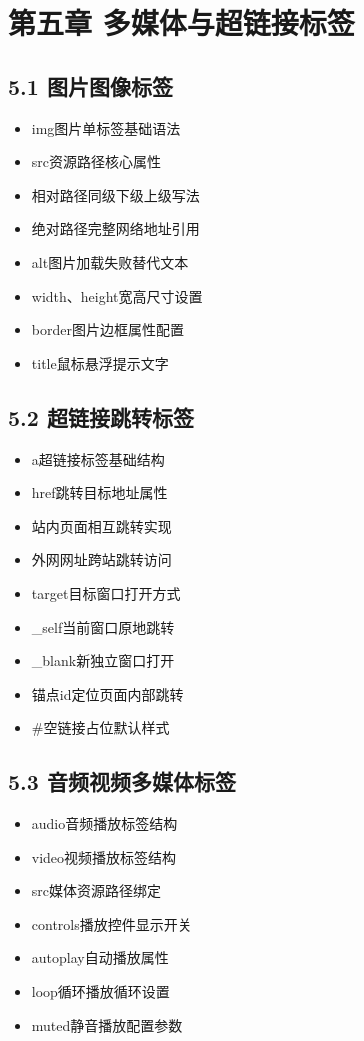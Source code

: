 \section{第五章 多媒体与超链接标签}
\subsection{5.1 图片图像标签}
\begin{itemize}[leftmargin=*]
\item img图片单标签基础语法
\item src资源路径核心属性
\item 相对路径同级下级上级写法
\item 绝对路径完整网络地址引用
\item alt图片加载失败替代文本
\item width、height宽高尺寸设置
\item border图片边框属性配置
\item title鼠标悬浮提示文字
\end{itemize}

\subsection{5.2 超链接跳转标签}
\begin{itemize}[leftmargin=*]
\item a超链接标签基础结构
\item href跳转目标地址属性
\item 站内页面相互跳转实现
\item 外网网址跨站跳转访问
\item target目标窗口打开方式
\item \_self当前窗口原地跳转
\item \_blank新独立窗口打开
\item 锚点id定位页面内部跳转
\item \#空链接占位默认样式
\end{itemize}

\subsection{5.3 音频视频多媒体标签}
\begin{itemize}[leftmargin=*]
\item audio音频播放标签结构
\item video视频播放标签结构
\item src媒体资源路径绑定
\item controls播放控件显示开关
\item autoplay自动播放属性
\item loop循环播放循环设置
\item muted静音播放配置参数
\end{itemize}

